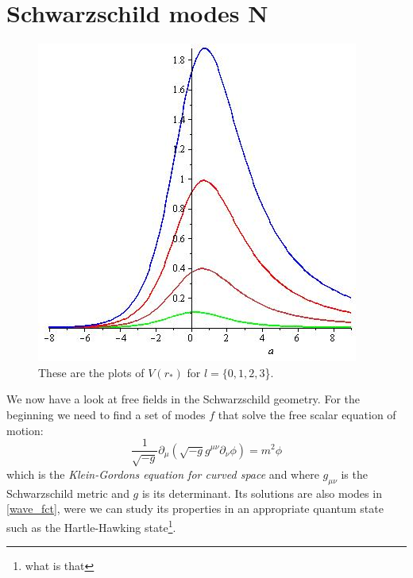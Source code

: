 \section{Schwarzschild modes \textbf{N}}
	\begin{figure} [tbp]
		\begin{center}
			\includegraphics[scale=0.5]{plots_of_V}
			\caption{These are the plots of $V(r_*)$ for $l=\{0,1,2,3$\}.} \label{plots_of_V}
		\end{center}
	\end{figure} %

	We now have a look at free fields in the Schwarzschild geometry. For the beginning we need to find a set of modes $f$ that solve the free scalar equation of motion:
		\begin{equation} \label{Klein_Gordon_curved}
			\frac{1}{\sqrt{-g}} \partial_\mu (\sqrt{-g} g^{\mu \nu} \partial_\nu \phi)
			= m^2 \phi
		\end{equation}
	which is the \textit{Klein-Gordons equation for curved space} and where $g_{\mu \nu}$ is the Schwarzschild metric and $g$ is its determinant. Its solutions are also modes in \eqref{wave_fct}, were we can study its properties in an appropriate quantum state such as the Hartle-Hawking state\footnote{what is that}.
	
